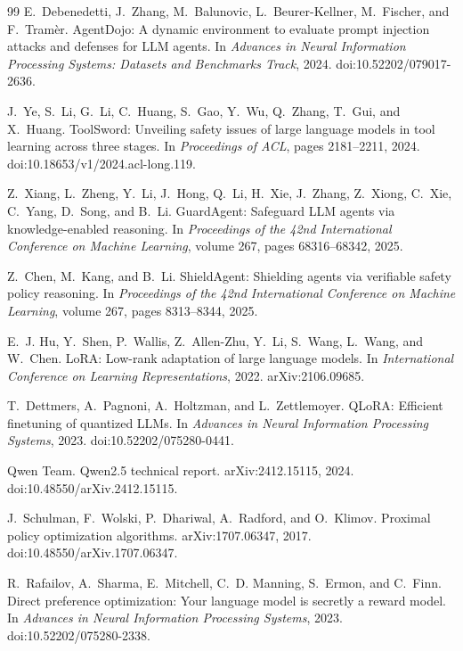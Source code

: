 \documentclass[11pt]{article}
\begin{document}
\begin{thebibliography}{99}
E.~Debenedetti, J.~Zhang, M.~Balunovic, L.~Beurer-Kellner, M.~Fischer, and F.~Tram\`er.
\newblock AgentDojo: A dynamic environment to evaluate prompt injection attacks and defenses for LLM agents.
\newblock In \emph{Advances in Neural Information Processing Systems: Datasets and Benchmarks Track}, 2024. doi:10.52202/079017-2636.

J.~Ye, S.~Li, G.~Li, C.~Huang, S.~Gao, Y.~Wu, Q.~Zhang, T.~Gui, and X.~Huang.
\newblock ToolSword: Unveiling safety issues of large language models in tool learning across three stages.
\newblock In \emph{Proceedings of ACL}, pages 2181--2211, 2024. doi:10.18653/v1/2024.acl-long.119.

Z.~Xiang, L.~Zheng, Y.~Li, J.~Hong, Q.~Li, H.~Xie, J.~Zhang, Z.~Xiong, C.~Xie, C.~Yang, D.~Song, and B.~Li.
\newblock GuardAgent: Safeguard LLM agents via knowledge-enabled reasoning.
\newblock In \emph{Proceedings of the 42nd International Conference on Machine Learning}, volume 267, pages 68316--68342, 2025.

Z.~Chen, M.~Kang, and B.~Li.
\newblock ShieldAgent: Shielding agents via verifiable safety policy reasoning.
\newblock In \emph{Proceedings of the 42nd International Conference on Machine Learning}, volume 267, pages 8313--8344, 2025.

E.~J. Hu, Y.~Shen, P.~Wallis, Z.~Allen-Zhu, Y.~Li, S.~Wang, L.~Wang, and W.~Chen.
\newblock LoRA: Low-rank adaptation of large language models.
\newblock In \emph{International Conference on Learning Representations}, 2022. arXiv:2106.09685.

T.~Dettmers, A.~Pagnoni, A.~Holtzman, and L.~Zettlemoyer.
\newblock QLoRA: Efficient finetuning of quantized LLMs.
\newblock In \emph{Advances in Neural Information Processing Systems}, 2023. doi:10.52202/075280-0441.

Qwen Team.
\newblock Qwen2.5 technical report.
\newblock arXiv:2412.15115, 2024. doi:10.48550/arXiv.2412.15115.

J.~Schulman, F.~Wolski, P.~Dhariwal, A.~Radford, and O.~Klimov.
\newblock Proximal policy optimization algorithms.
\newblock arXiv:1707.06347, 2017. doi:10.48550/arXiv.1707.06347.

R.~Rafailov, A.~Sharma, E.~Mitchell, C.~D. Manning, S.~Ermon, and C.~Finn.
\newblock Direct preference optimization: Your language model is secretly a reward model.
\newblock In \emph{Advances in Neural Information Processing Systems}, 2023. doi:10.52202/075280-2338.


\end{thebibliography}
\end{document}
